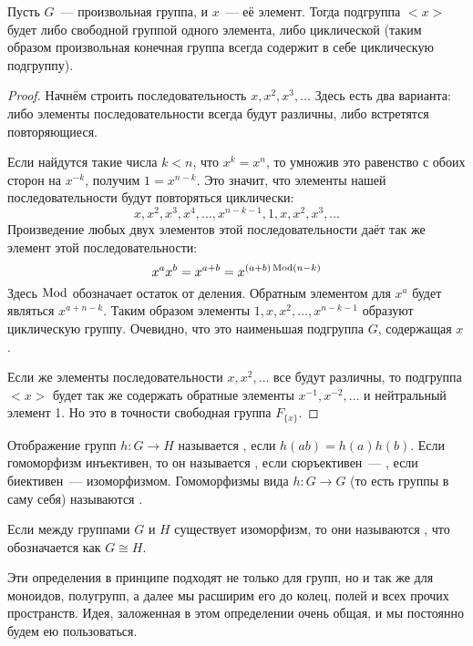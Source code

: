 \begin{thm}
	Пусть $G$~--- произвольная группа, и $x$~--- её элемент. Тогда подгруппа $<x>$ будет либо свободной группой одного элемента, либо циклической (таким образом произвольная конечная группа всегда содержит в себе циклическую подгруппу).
\end{thm}
\begin{proof}
	Начнём строить последовательность $x, x^2, x^3, \ldots$ Здесь есть два варианта: либо элементы последовательности всегда будут различны, либо встретятся повторяющиеся.
	
	Если найдутся такие числа $k<n$, что $x^k = x^n$, то умножив это равенство с обоих сторон на $x^{-k}$, получим $1 = x^{n-k}$. Это значит, что элементы нашей последовательности будут повторяться циклически:
	\[
	x, x^2, x^3, x^4, \ldots, x^{n-k-1}, 1, x, x^2, x^3, \ldots
	\]
	Произведение любых двух элементов этой последовательности даёт так же элемент этой последовательности:
	\[
	x^a x^b = x^{a + b} = x^{(a+b)\operatorname{Mod} (n-k)}
	\]
	Здесь $\operatorname{Mod}$ обозначает остаток от деления. Обратным элементом для $x^a$ будет являться $x^{a+n-k}$. Таким образом элементы $1, x, x^2, \ldots, x^{n-k-1}$ образуют циклическую группу. Очевидно, что это наименьшая подгруппа $G$, содержащая $x$.
	
	Если же элементы последовательности $x, x^2, \ldots$ все будут различны, то подгруппа $<x>$ будет так же содержать обратные элементы $x^{-1}, x^{-2}, \ldots$ и нейтральный элемент 1. Но это в точности свободная группа $F_{\{x\}}$.
\end{proof}

\begin{definition}
	Отображение групп $h:G\to H$ называется , если $h(ab) = h(a)h(b)$. Если гомоморфизм инъективен, то он называется , если сюръективен~--- , если биективен~--- изоморфизмом. Гомоморфизмы вида $h:G\to G$ (то есть группы в саму себя) называются .
\end{definition}

\begin{definition}
	Если между группами $G$ и $H$ существует изоморфизм, то они называются , что обозначается как $G\cong H$.
\end{definition}

Эти определения в принципе подходят не только для групп, но и так же для моноидов, полугрупп, а далее мы расширим его до колец, полей и всех прочих пространств. Идея, заложенная в этом определении очень общая, и мы постоянно будем ею пользоваться.

